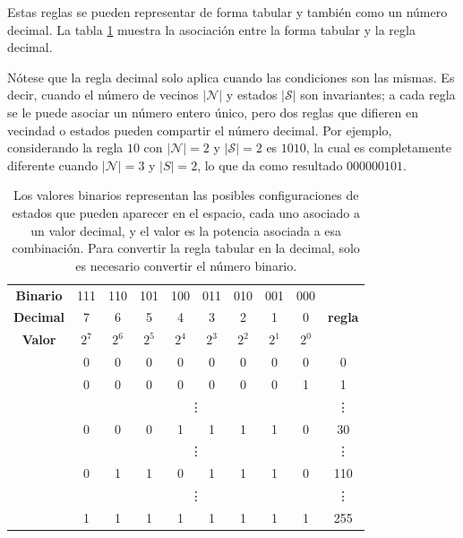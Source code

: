 Estas reglas se pueden representar de forma tabular y también como un número decimal. La tabla \ref{tab:ECA_rules} muestra la asociación entre la forma tabular y la regla decimal.

Nótese que la regla decimal solo aplica cuando las condiciones son las mismas. Es decir, cuando el número de vecinos $|\mathcal{N}|$ y estados $|\mathcal{S}|$ son invariantes; a cada regla se le puede asociar un número entero único, pero dos reglas que difieren en vecindad o estados pueden compartir el número decimal. Por ejemplo, considerando la regla $10$ con $|\mathcal{N}| = 2$ y $|\mathcal{S}| = 2$ es $1010$, la cual es completamente diferente cuando $|\mathcal{N}| = 3$ y $|S| = 2$, lo que da como resultado $ 000000101$.

\begin{table}
	
	\centering
	
	\begin{tabular}{c | c c c c c c c c | c} 
		
		\textbf{Binario} &111 & 110 & 101 & 100 & 011 & 010 & 001 & 000 & \multirow{3}{*}{\textbf{regla}} \\ 
		
		\textbf{Decimal} & 7 & 6 & 5 & 4 & 3 & 2 & 1 & 0 & \\ 
		
		\textbf{Valor} & $2^7$ & $2^6$ & $2^5$ & $2^4$ & $2^3$ & $2^2$ & $2^1$ & $2^0$ & \\ \hline
		
		& 0 &  0 &  0 &  0 &  0 &  0 &  0 &  0 & 0 \\
		
		& 0 &  0 &  0 &  0 &  0 &  0 &  0 &  1 & 1 \\
		
		& \multicolumn{8}{c|}{\vdots} & \vdots \\ 
		
		& 0 &  0 &  0 &  1 &  1 &  1 &  1 &  0 & 30 \\
		
		& \multicolumn{8}{c|}{\vdots} & \vdots \\ 
		
		& 0 &  1 &  1 &  0 &  1 &  1 &  1 &  0 & 110 \\
		
		& \multicolumn{8}{c|}{\vdots} & \vdots \\ 
		
		& 1 &  1 &  1 &  1 &  1 &  1 &  1 &  1 & 255 
		
	\end{tabular}
	
	\caption{Los valores binarios representan las posibles configuraciones de estados que pueden aparecer en el espacio, cada uno asociado a un valor decimal, y el valor es la potencia asociada a esa combinación. Para convertir la regla tabular en la decimal, solo es necesario convertir el número binario.} 
	
	\label{tab:ECA_rules}
	
\end{table}

